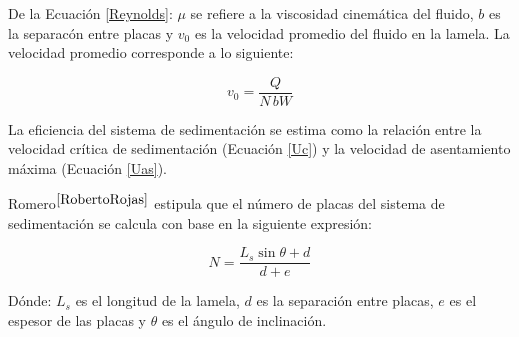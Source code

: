 De la Ecuaci\'on \ref{Reynolds}: $\mu$ se refiere a la viscosidad cinem\'atica del fluido, $b$ es la separac\'on entre placas y $v_0$ es la velocidad promedio del fluido en la lamela. La velocidad promedio corresponde a lo siguiente:

\begin{equation}
	v_0 = \frac{Q}{N \, b W}
	\label{v0}
\end{equation}


\noindent
\justify

La eficiencia del sistema de sedimentaci\'on se estima como la relaci\'on entre la velocidad cr\'itica de sedimentaci\'on (Ecuaci\'on \ref{Uc}) y la velocidad de asentamiento m\'axima (Ecuaci\'on \ref{Uas}).


\noindent
\justify

Romero$^{\cite{RobertoRojas}}$ estipula que el n\'umero de placas del sistema de sedimentaci\'on se calcula con base en la siguiente expresi\'on:

\begin{equation}
	N = \frac{L_s \sin \theta + d}{d+e}
	\label{NL}
\end{equation}

\noindent
\justify

D\'onde: $L_s$ es el longitud de la lamela, $d$ es la separaci\'on entre placas, $e$ es el espesor de las placas y $\theta$ es el \'angulo de inclinaci\'on.
